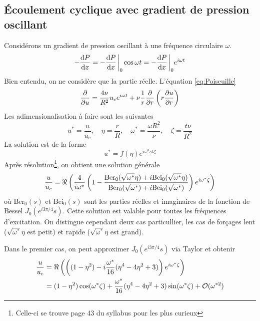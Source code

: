 \documentclass[a4paper,11pt]{report}
\newcommand{\recip}[1]{\frac{1}{#1}}
\newcommand{\Ber}[0]{\textrm{Ber}}
\newcommand{\Bei}[0]{\textrm{Bei}}
\begin{document}
    \subsection{Écoulement cyclique avec gradient de pression oscillant}
      Considérons un gradient de pression oscillant à une fréquence circulaire $\omega$.
      \begin{equation}
        -\dv{P}{x} = -\dv{P}{x}\eval_0 \cos{\omega t} = -\dv{P}{x}\eval_0 e^{i\omega t}
      \end{equation}
      Bien entendu, on ne considère que la partie réelle. L'équation \ref{eq:Poiseuille}
      \begin{equation}
        \pdv{u} = \frac{4\nu}{R^2} u_c e^{i\omega t} + \nu \recip{r}\pdv{}{r} \left(r\pdv{u}{r}\right)
      \end{equation}
      Les adimensionalisation à faire sont les suivantes
      \begin{equation}
        u^\ast = \frac{u}{u_c}, \quad \eta = \frac{r}{R}, \quad \omega^\ast = \frac{\omega R^2}{\nu}, \quad \zeta = \frac{t\nu}{R^2}
      \end{equation}
      La solution est de la forme
      \begin{equation}
        u^\ast = f(\eta) e^{i\omega^ast \zeta}
      \end{equation}
      Après résolution\footnote{Celle-ci se trouve page 43 du syllabus pour les plus curieux}, on obtient une solution générale
      \begin{equation}
        \frac{u}{u_c} = \real \left( \frac{4}{i\omega^\ast} \left( 1 - \frac{\Ber_0(\sqrt{\omega^\ast} \eta) + i \Bei_0(\sqrt{\omega^\ast} \eta)}{\Ber_0(\sqrt{\omega^\ast}) + i \Bei_0(\sqrt{\omega^\ast})} \right) e^{i\omega^\ast \zeta}\right)
      \end{equation}
      où $\Ber_0(s)$ et $\Bei_0(s)$ sont les parties réelles et imaginaires de la fonction de Bessel $J_0(e^{i3\pi/4}s)$. Cette solution est valable pour toutes les fréquences d'excitation. On distingue cependant deux cas particullier, les cas de forçages lent ($\sqrt{\omega^\ast}\eta$ est petit) et rapide ($\sqrt{\omega^\ast}\eta$ est grand).

      Dans le premier cas, on peut approximer $J_0(e^{i3\pi/4}s)$ via Taylor et obtenir
      \begin{equation}
        \begin{aligned}
          \frac{u}{u_c} &= \real \left(\left((1-\eta^2) - i \frac{\omega^\ast}{16} (\eta^4 - 4 \eta^2 +3) \right)e^{i\omega^\ast \zeta}\right)\\
          &= (1- \eta^2) \cos(\omega^\ast \zeta) + \frac{\omega^\ast}{16} (\eta^4 - 4 \eta^2 +3) \sin (\omega^\ast \zeta) + \mathcal{O}(\omega^{\ast2})
        \end{aligned}
      \end{equation}
\end{document}
